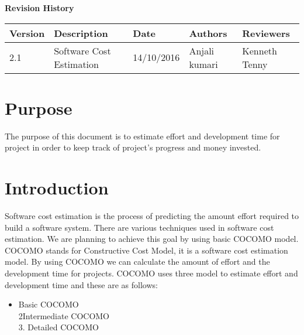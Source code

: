 \documentclass[12pt]{article}
\begin{document}
	\textbf{Revision History}
	\begin{center}
		\begin{tabular}{ | m{3em} | m{8em} | m{5em} | m{4em} | m{4em} | }
			\hline
			Version & Description & Date       & Authors            & Reviewers \\
			\hline
			2.1     & Software Cost Estimation    & 14/10/2016 & Anjali kumari & Kenneth Tenny  \\ 

			\hline
		
		\end{tabular}
	\end{center}
	
	\newpage
	\hline
\tableofcontents
\newpage

\section{Purpose}

The purpose of this document is to estimate effort and development time for project in order to keep track of project's progress and money invested.\\

\section{Introduction}
Software cost estimation is the process of predicting the amount effort required to build a software system. There are various techniques used in software cost estimation. We are planning to achieve this goal by using basic COCOMO model. COCOMO stands for Constructive Cost Model, it is a software cost estimation model. By using COCOMO we can calculate the amount of effort and the development time for projects. COCOMO uses three model to estimate effort and development time and these are as follows:

\begin{itemize}
 \item Basic COCOMO  \\
2Intermediate COCOMO \\
3. Detailed COCOMO    \\
\end{itemize}
\end{document}

